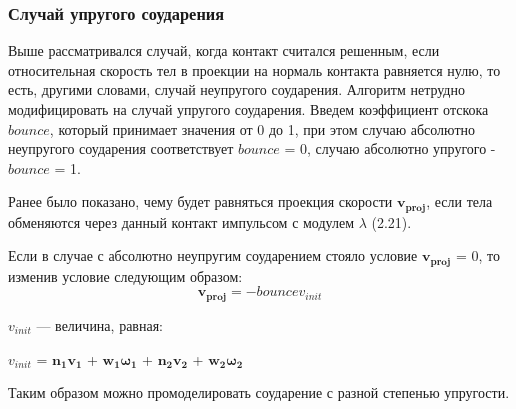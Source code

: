\subsubsection{Случай упругого соударения}
Выше рассматривался случай, когда контакт считался решенным, если относительная скорость тел в проекции на нормаль контакта равняется нулю,
то есть, другими словами, случай неупругого соударения.
Алгоритм нетрудно модифицировать на случай упругого соударения. Введем коэффициент отскока $bounce$,
который принимает значения от 0 до 1, при этом случаю абсолютно неупругого соударения соответствует $bounce$ = 0, случаю абсолютно упругого - $bounce$ = 1.

Ранее было показано, чему будет равняться проекция скорости $\mathbf{v_{proj}}$,
если тела обменяются через данный контакт импульсом с модулем $\lambda$ (2.21).

Если в случае с абсолютно неупругим соударением стояло условие $\mathbf{v_{proj}}$ = 0, то изменив условие следующим образом:
\begin{equation}
\mathbf{v_{proj}}= -bounce{v_{init}}
\end{equation}
\begin{eqrem}
$v_{init}$ --- величина, равная:

  $v_{init}$  = $\mathbf{n_1}\mathbf{v_1}$ + $\mathbf{w_1}\mathbf{\omega_{1}}$
	      + $\mathbf{n_2}\mathbf{v_2}$ + $\mathbf{w_2}\mathbf{\omega_{2}}$
\end{eqrem}

Таким образом можно промоделировать соударение с разной степенью упругости.